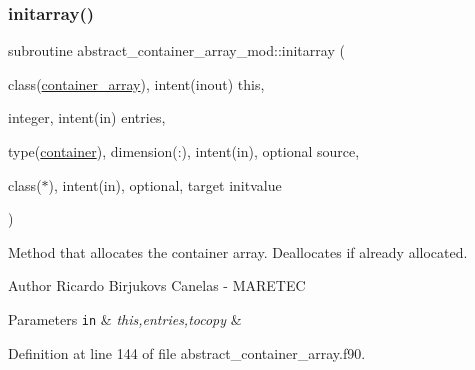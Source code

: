 \mbox{\label{namespaceabstract__container__array__mod_a793ed0fff6fc6c5823f1e7f119f44959}} 
\subsubsection{\texorpdfstring{initarray()}{initarray()}}
{\footnotesize\ttfamily subroutine abstract\+\_\+container\+\_\+array\+\_\+mod\+::initarray (\begin{DoxyParamCaption}\item[{class(\mbox{\hyperlink{structabstract__container__array__mod_1_1container__array}{container\+\_\+array}}), intent(inout)}]{this,  }\item[{integer, intent(in)}]{entries,  }\item[{type(\mbox{\hyperlink{structcontainer__mod_1_1container}{container}}), dimension(\+:), intent(in), optional}]{source,  }\item[{class($\ast$), intent(in), optional, target}]{initvalue }\end{DoxyParamCaption})\hspace{0.3cm}{\ttfamily [private]}}



Method that allocates the container array. Deallocates if already allocated. 

\begin{DoxyAuthor}{Author}
Ricardo Birjukovs Canelas -\/ M\+A\+R\+E\+T\+EC 
\end{DoxyAuthor}

\begin{DoxyParams}[1]{Parameters}
\mbox{\tt in}  & {\em this,entries,tocopy} & \\
\hline
\end{DoxyParams}


Definition at line 144 of file abstract\+\_\+container\+\_\+array.\+f90.

\mbox{\label{namespaceabstract__container__array__mod_aae1f6309c51e282a528ce78f128443e0}} 
